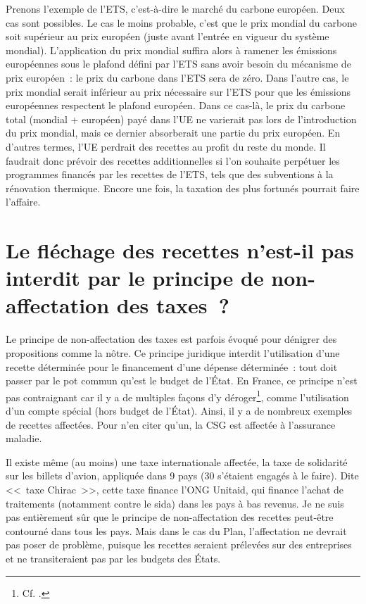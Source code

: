 \documentclass[a5paper,french]{memoir}
\begin{document}
Prenons l'exemple de l'ETS, c'est-à-dire le marché du carbone européen. Deux cas sont possibles. Le cas le moins probable, c'est que le prix mondial du carbone soit supérieur au prix européen (juste avant l'entrée en vigueur du système mondial). L'application du prix mondial suffira alors à ramener les émissions européennes sous le plafond défini par l'ETS sans avoir besoin du mécanisme de prix européen~: le prix du carbone dans l'ETS sera de zéro. Dans l'autre cas, le prix mondial serait inférieur au prix nécessaire sur l'ETS pour que les émissions européennes respectent le plafond européen. Dans ce cas-là, le prix du carbone total (mondial + européen) payé dans l'UE ne varierait pas lors de l'introduction du prix mondial, mais ce dernier absorberait une partie du prix européen. En d'autres termes, l'UE perdrait des recettes au profit du reste du monde. Il faudrait donc prévoir des recettes additionnelles si l'on souhaite perpétuer les programmes financés par les recettes de l'ETS, tels que des subventions à la rénovation thermique. Encore une fois, la taxation des plus fortunés pourrait faire l'affaire.

\section*{\normalsize Le fléchage des recettes n'est-il pas interdit par le principe de non-affectation des taxes~?}\label{q:affectation}

Le principe de non-affectation des taxes est parfois évoqué pour dénigrer des propositions comme la nôtre. Ce principe juridique interdit l'utilisation d'une recette déterminée pour le financement d'une dépense déterminée~: tout doit passer par le pot commun qu'est le budget de l'État. En France, ce principe n'est pas contraignant car il y a de multiples façons d'y déroger\footnote{Cf. \cite{boutron_contours_2013}.}, comme l'utilisation d'un compte spécial (hors budget de l'État). Ainsi, il y a de nombreux exemples de recettes affectées. Pour n'en citer qu'un, la CSG est affectée à l'assurance maladie. 

Il existe même (au moins) une taxe internationale affectée, la taxe de solidarité sur les billets d'avion, appliquée dans 9 pays (30 s'étaient engagés à le faire). Dite <<~taxe Chirac~>>, cette taxe finance l'ONG Unitaid, qui finance l'achat de traitements (notamment contre le sida) dans les pays à bas revenus. 
Je ne suis pas entièrement sûr que le principe de non-affectation des recettes peut-être contourné dans tous les pays. Mais dans le cas du Plan, l'affectation ne devrait pas poser de problème, puisque les recettes seraient prélevées sur des entreprises et ne transiteraient pas par les budgets des États. 
\end{document}
